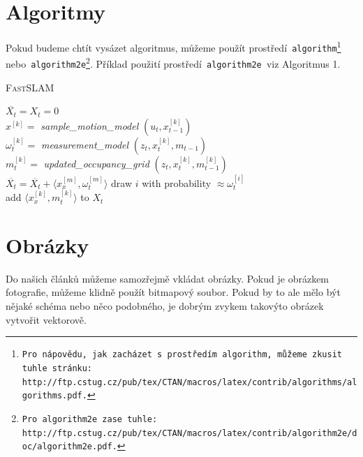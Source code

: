 \documentclass[a4paper, 11pt]{article}
\begin{document}
\section{Algoritmy}
\label{Alg}
Pokud budeme chtít vysázet algoritmus, můžeme použít prostředí\texttt{ algorithm\footnote{Pro nápovědu, jak zacházet s prostředím\texttt{ algorithm}, můžeme zkusit tuhle stránku:\\
http://ftp.cstug.cz/pub/tex/CTAN/macros/latex/contrib/algorithms/algorithms.pdf.} }nebo\texttt{ algorithm2e\footnote{Pro\texttt{ algorithm2e }zase tuhle: http://ftp.cstug.cz/pub/tex/CTAN/macros/latex/contrib/algorithm2e/doc/algorithm2e.pdf.}}.
Příklad použití prostředí\texttt{ algorithm2e }viz Algoritmus 1.
\bigskip
\begin{algorithm}
\caption{\textsc{FastSLAM}}
\label{fastSLAM_alg}
\SetNlSkip{-1em}
\SetInd{1em}{0em}
\SetNlSty{}{}{:}
\BlankLine
\Indp
\Indpp
$\overline{X_t} = X_t = 0$\\
{
    $x^{[k]} = $ \emph{sample\_motion\_model} $(u_t, x_{t-1}^{[k]})$\\
    $\omega_{t}^{[k]} = $ \emph{measurement\_model} $(z_{t},x_{t}^{[k]},m_{t-1})$\\
    $m_{t}^{[k]} = $ \emph{updated\_occupancy\_grid} $(z_{t},x_{t}^{[k]},m_{t-1}^{[k]})$\\
    $\overline{X_t} = \overline{X_t} + \langle x_{x}^{[m]},\omega_{t}^{[m]} \rangle$
}
{
    draw $i$ with probability $\approx \omega_{t}^{[i]}$\\
    add $\langle x_{x}^{[k]},m_{t}^{[k]}\rangle$ to $X_t$
}
\end{algorithm}

\section{Obrázky}
Do našich článků můžeme samozřejmě vkládat obrázky. Pokud je obrázkem fotografie, můžeme klidně použít
bitmapový soubor. Pokud by to ale mělo být nějaké schéma nebo něco podobného, je dobrým zvykem takovýto
obrázek vytvořit vektorově.
\end{document}
